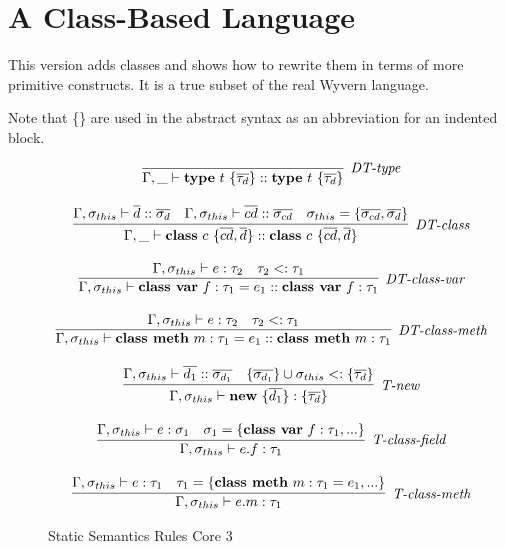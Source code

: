 \section{A Class-Based Language}

This version adds classes and shows how to rewrite them in terms of
more primitive constructs.  It is a true subset of the real Wyvern
language.

Note that \{\} are used in the abstract syntax as an abbreviation for
an indented block.





\clearpage


\begin{figure}
\centering
\[
\begin{array}{c}
\infer[\textit{DT-type}]
	{\Gamma, \_ \vdash \keyw{type}~ t ~ \{\overline{\tau_d}\} :: \keyw{type}~ t ~ \{\overline{\tau_d}\} } 
	{}\\[3ex]
\infer[\textit{DT-class}]
	{\Gamma, \_ \vdash \keyw{class}~ c ~ \{\overline{cd}, \overline d\} :: \keyw{class}~ c ~ \{\overline{cd}, \overline d\} } 
	{\Gamma, \sigma_{this} \vdash \overline d :: \overline{\sigma_d} & \Gamma, \sigma_{this} \vdash \overline{cd} :: \overline{\sigma_{cd}} & \sigma_{this} = \{\overline{\sigma_{cd}}, \overline{\sigma_d} \} }\\[3ex]
\infer[\textit{DT-class-var}]
	{\Gamma, \sigma_{this} \vdash \keyw{class var} ~ f : \tau_1 = e_1 :: \keyw{class var}~ f : \tau_1 } 
	{\Gamma, \sigma_{this} \vdash e : \tau_2 & \tau_2 <: \tau_1 }\\[3ex]
\infer[\textit{DT-class-meth}]
	{\Gamma, \sigma_{this} \vdash \keyw{class meth} ~ m : \tau_1 = e_1 :: \keyw{class meth}~ m : \tau_1 } 
	{\Gamma, \sigma_{this} \vdash e : \tau_2 & \tau_2 <: \tau_1 }\\[3ex]
\infer[\textit{T-new}]
	{\Gamma, \sigma_{this} \vdash \keyw{new}~ \{ \overline{d_1} \} : \{ \overline{\tau_d} \}}
	{\Gamma,\sigma_{this} \vdash \overline{d_1} :: \overline{\sigma_{d_1}} & \{\overline{\sigma_{d_1}}\} \union \sigma_{this} <: \{\overline{\tau_d} \} } \\[3ex]
\infer[\textit{T-class-field}]
	{\Gamma, \sigma_{this} \vdash  e.f:\tau_1} 
	{\Gamma, \sigma_{this} \vdash e : \sigma_1 & \sigma_1 = \{\keyw{class var}~ f:\tau_1,... \} }\\[3ex]
\infer[\textit{T-class-meth}]
	{\Gamma, \sigma_{this} \vdash  e.m:\tau_1} 
	{\Gamma, \sigma_{this} \vdash e : \tau_1 & \tau_1 = \{\keyw{class meth}~ m:\tau_1=e_1,... \} }
\end{array}
\]
\caption{Static Semantics Rules Core 3}
\end{figure}



